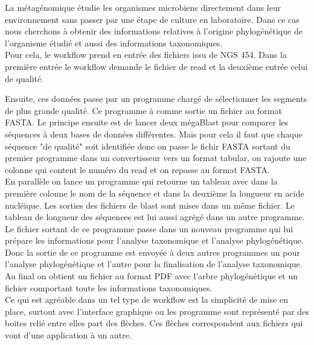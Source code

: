 La métagénomique étudie les organismes microbiens directement dans leur environnement sans passer par une étape de culture en laboratoire. Dans ce cas nous cherchons à obtenir des informations relatives à l'origine phylogénétique de l'organisme étudié et aussi des informations taxonomiques.\\
Pour cela, le workflow prend en entrée des fichiers issu de NGS 454. Dans la première entrée le workflow demande le fichier de read et la deuxième entrée celui de qualité.
\newpage

Ensuite, ces données passe par un programme chargé de sélectionner les segments de plus grande qualité. Ce programme à comme sortie un fichier au format FASTA.  Le principe ensuite est de lancer deux mégaBlast pour comparer les séquences à deux bases de données différentes. Mais pour cela il faut que chaque séquence "de qualité" soit identifiée donc on passe le fichir FASTA sortant du premier programme dans un convertisseur vers un format tabular, on rajoute une colonne qui content le numéro du read et on repasse au format FASTA.\\
 
En parallèle on lance un programme qui retourne un tableau avec dans la première colonne le nom de la séquence et dans la deuxième la longueur en acide nucléique. Les sorties des fichiers de blast sont mises dans un même fichier. Le tableau de longueur des séquences est lui aussi agrégé dans un autre programme. Le fichier sortant de ce programme passe dans un nouveau programme qui lui prépare les informations pour l'analyse taxonomique et l'analyse phylogénétique.\\

Donc la sortie de ce programme est envoyée à deux autres programmes un pour l'analyse phylogénétique et l'autre pour la finalisation de l'analyse taxonomique. Au final on obtient un fichier au format PDF avec l'arbre phylogénétique et un fichier comportant toute les informations taxonomiques.\\



Ce qui est agréable dans un tel type de workflow est la simplicité de mise en place, surtout avec l'interface graphique ou les programme sont représenté par des boites relié entre elles part des flèches. Ces flèches correspondent aux fichiers qui vont d'une application à un autre.\\